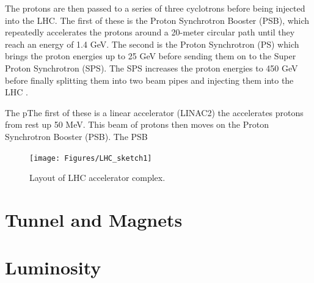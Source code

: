 The protons are then passed to a series of three cyclotrons before being injected into the LHC.  The first of these is the Proton Synchrotron Booster (PSB), which repeatedly accelerates the protons around a 20-meter circular path until they reach an energy of 1.4 GeV.  The second is the Proton Synchrotron (PS) which brings the proton energies up to 25 GeV before sending them on to the Super Proton Synchrotron (SPS).  The SPS increases the proton energies to 450 GeV before finally splitting them into two beam pipes and injecting them into the LHC .  

  The pThe first of these is a linear accelerator (LINAC2) the accelerates protons from rest up 50 MeV.  This beam of protons then moves on the Proton Synchrotron Booster (PSB).  The PSB

\begin{figure}[h]
	\centering
	\texttt{[image: Figures/LHC\_sketch1]}
	\caption{Layout of LHC accelerator complex.}
	\label{fig:lhcsketch}
\end{figure}


\section{Tunnel and Magnets}


\section{Luminosity} 
